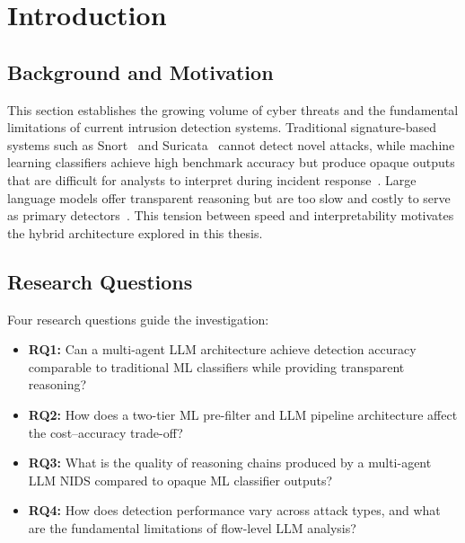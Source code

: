 \documentclass[12pt,openany,oneside,a4paper]{book}
\begin{document}
\tableofcontents

\listoffigures
{}

\listoftables
{}

\cleardoublepage

\mainmatter

\chapter{Introduction}
\label{ch:introduction}

\section{Background and Motivation}
\label{sec:background-motivation}
This section establishes the growing volume of cyber threats and the fundamental limitations of current intrusion detection systems. Traditional signature-based systems such as Snort~\autocite{Roesch1999} and Suricata~\autocite{OISF2010} cannot detect novel attacks, while machine learning classifiers achieve high benchmark accuracy but produce opaque outputs that are difficult for analysts to interpret during incident response~\autocite{Hesford2024}. Large language models offer transparent reasoning but are too slow and costly to serve as primary detectors~\autocite{Houssel2024}. This tension between speed and interpretability motivates the hybrid architecture explored in this thesis.

\section{Research Questions}
\label{sec:research-questions}
Four research questions guide the investigation:
\begin{itemize}[leftmargin=1.5em]
  \item \textbf{RQ1:} Can a multi-agent LLM architecture achieve detection accuracy comparable to traditional ML classifiers while providing transparent reasoning?
  \item \textbf{RQ2:} How does a two-tier ML pre-filter and LLM pipeline architecture affect the cost--accuracy trade-off?
  \item \textbf{RQ3:} What is the quality of reasoning chains produced by a multi-agent LLM NIDS compared to opaque ML classifier outputs?
  \item \textbf{RQ4:} How does detection performance vary across attack types, and what are the fundamental limitations of flow-level LLM analysis?
\end{itemize}
\end{document}
